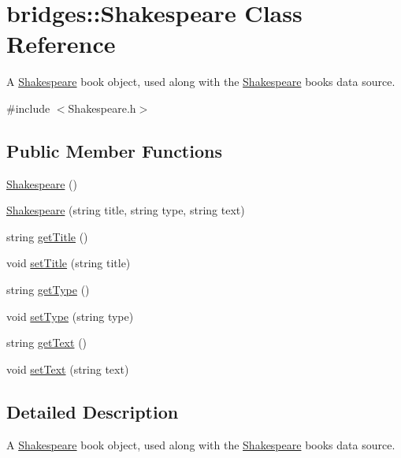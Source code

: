 \hypertarget{classbridges_1_1_shakespeare}{}\section{bridges\+:\+:Shakespeare Class Reference}
\label{classbridges_1_1_shakespeare}


A \mbox{\hyperlink{classbridges_1_1_shakespeare}{Shakespeare}} book object, used along with the \mbox{\hyperlink{classbridges_1_1_shakespeare}{Shakespeare}} books data source.  




{\ttfamily \#include $<$Shakespeare.\+h$>$}

\subsection*{Public Member Functions}
\begin{DoxyCompactItemize}
\item 
\mbox{\hyperlink{classbridges_1_1_shakespeare_aa1903f3ffb483345c4053c2f315571eb}{Shakespeare}} ()
\item 
\mbox{\hyperlink{classbridges_1_1_shakespeare_a020cc81d13f5c17e362d467d700ac781}{Shakespeare}} (string title, string type, string text)
\item 
string \mbox{\hyperlink{classbridges_1_1_shakespeare_a8729b7dbdddfa4093378268ba90b01cb}{get\+Title}} ()
\item 
void \mbox{\hyperlink{classbridges_1_1_shakespeare_a533ff5a5dd8681ab1156c7345f85ad82}{set\+Title}} (string title)
\item 
string \mbox{\hyperlink{classbridges_1_1_shakespeare_a556df47f2ed9522d3f4906428af2cf7e}{get\+Type}} ()
\item 
void \mbox{\hyperlink{classbridges_1_1_shakespeare_a2bc1ebcfa8b28a590a1f6f83e26ce051}{set\+Type}} (string type)
\item 
string \mbox{\hyperlink{classbridges_1_1_shakespeare_a8f43fd74180dd3a5591840b464774b08}{get\+Text}} ()
\item 
void \mbox{\hyperlink{classbridges_1_1_shakespeare_a58e8cb2a96ce9af45fcf963694a3aba7}{set\+Text}} (string text)
\end{DoxyCompactItemize}


\subsection{Detailed Description}
A \mbox{\hyperlink{classbridges_1_1_shakespeare}{Shakespeare}} book object, used along with the \mbox{\hyperlink{classbridges_1_1_shakespeare}{Shakespeare}} books data source. 

